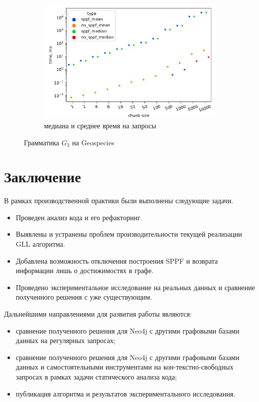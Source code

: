 \documentclass[14pt]{matmex-diploma-custom}
\theoremstyle{definition}
\begin{document}
\begin{figure}[H]
\begin{subfigure}[b]{0.5\textwidth}
    \includegraphics[width=\textwidth]{pics/geo_bt_mean&median.pdf_1.jpg}  \caption{медиана и среднее время на запросы}
    \label{fig:subim0}
    \end{subfigure} \caption{Грамматика $G_3$ на Geospecies}

\label{ssss}
\end{figure}

\section{Заключение}

В рамках производственной практики были выполнены следующие задачи.
\begin{itemize}
    \item Проведен анализ кода и его рефакторинг.
    \item Выявлены и устранены проблем производительности текущей реализации GLL алгоритма.
    \item Добавлена возможность отключения построения SPPF и возврата информации лишь о достижимостях в графе.
    \item Проведено экспериментальное исследование на реальных данных и сравнение полученного решения с уже существующим.
\end{itemize}

Дальнейшими направлениями для развития работы являются:
\begin{itemize}
    \item сравнение полученного решения для Neo4j с другими графовыми базами данных на регулярных запросах;
    \item сравнение полученного решения для Neo4j с другими графовыми базами данных и самостоятельными инструментами на кон-текстно-свободных запросах в рамках задачи статического анализа кода;
    \item публикация алгоритма и результатов экспериментального исследования.
\end{itemize}
\setmonofont[Mapping=tex-text]{CMU Typewriter Text}


\end{document}
